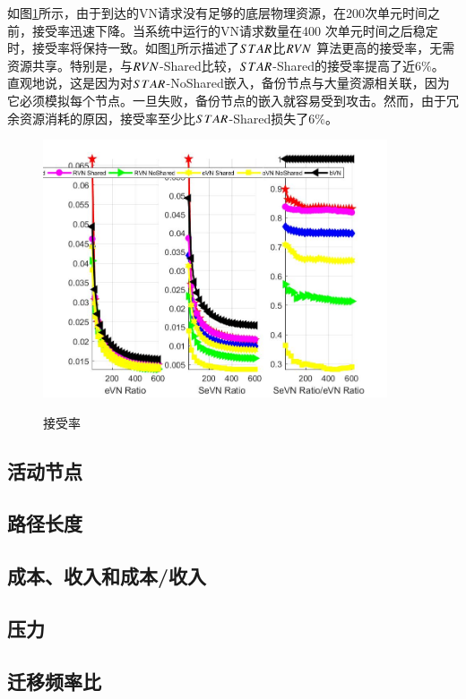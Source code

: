 如图\ref{fig:AcceptionRatio}所示，由于到达的VN请求没有足够的底层物理资源，在200次单元时间之前，接受率迅速下降。当系统中运行的VN请求数量在400 次单元时间之后稳定时，接受率将保持一致。如图\ref{fig:AcceptionRatio}所示描述了$STAR$比$RVN$ 算法更高的接受率，无需资源共享。特别是，与$RVN$-Shared比较，$STAR$-Shared的接受率提高了近6\%。 直观地说，这是因为对$STAR$-NoShared嵌入，备份节点与大量资源相关联，因为它必须模拟每个节点。一旦失败，备份节点的嵌入就容易受到攻击。然而，由于冗余资源消耗的原因，接受率至少比$STAR$-Shared损失了6\%。
\begin{figure}
  \centering
  \includegraphics[width=4in]{figures/AcceptionRatio}\\
  \caption{接受率}\label{fig:AcceptionRatio}
\end{figure}
\subsection{活动节点}
\subsection{路径长度}
\subsection{成本、收入和成本/收入}
\subsection{压力}
\subsection{迁移频率比}

